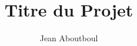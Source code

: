 \documentclass[a4paper, twoside]{report}
\title{Titre du Projet}
\author{Jean Aboutboul}
\begin{document}

\newpage
\renewcommand{\headrulewidth}{0pt}
\strut
\newpage
\tableofcontents











%
%
\end{document}
